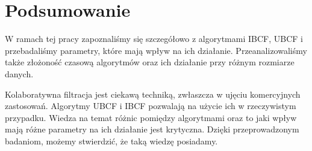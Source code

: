 \documentclass[12pt, a4paper]{article}
\begin{document}
\section{Podsumowanie}

W ramach tej pracy zapoznaliśmy się szczegółowo z algorytmami IBCF, UBCF i przebadaliśmy parametry, które mają wpływ na ich działanie. Przeanalizowaliśmy także złożoność czasową algorytmów oraz ich działanie przy różnym rozmiarze danych.

Kolaboratywna filtracja jest ciekawą techniką, zwłaszcza w ujęciu komercyjnych zastosowań. Algorytmy UBCF i IBCF pozwalają na użycie ich w rzeczywistym przypadku. Wiedza na temat różnic pomiędzy algorytmami oraz to jaki wpływ mają różne parametry na ich działanie jest krytyczna. Dzięki przeprowadzonym badaniom, możemy stwierdzić, że taką wiedzę posiadamy.



\nocite{*}


\end{document}
